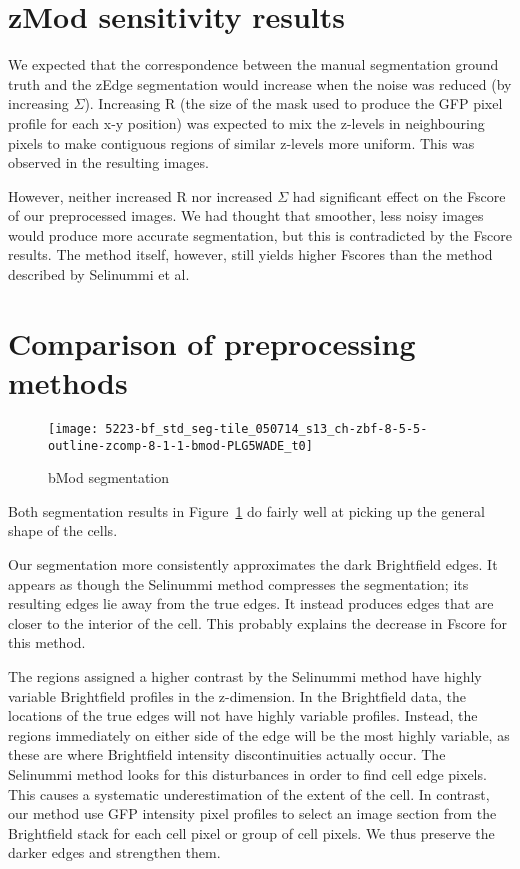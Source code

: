 \section{zMod sensitivity results}

We expected that the correspondence between the manual segmentation ground truth and the zEdge segmentation would increase when the noise was reduced (by increasing $\Sigma$). Increasing R (the size of the mask used to produce the GFP pixel profile for each x-y position) was expected to mix the z-levels in neighbouring pixels to make contiguous regions of similar z-levels more uniform. This was observed in the resulting images.

However, neither increased R nor increased $\Sigma$ had significant effect on the Fscore of our preprocessed images. We had thought that smoother, less noisy images would produce more accurate segmentation, but this is contradicted by the Fscore results. The method itself, however, still yields higher Fscores than the method described by Selinummi et al.

\section{Comparison of preprocessing methods}

\begin{figure}[htbp!]
\centering
\texttt{[image: 5223-bf\_std\_seg-tile\_050714\_s13\_ch-zbf-8-5-5-outline-zcomp-8-1-1-bmod-PLG5WADE\_t0]}
\caption{bMod segmentation}
\label{fig:bmod_segmentation}
\end{figure}

Both segmentation results in Figure~\ref{fig:bmod_segmentation} do fairly well at picking up the general shape of the cells.

Our segmentation more consistently approximates the dark Brightfield edges. It appears as though the Selinummi method compresses the segmentation; its resulting edges lie away from the true edges. It instead produces edges that are closer to the interior of the cell. This probably explains the decrease in Fscore for this method.

The regions assigned a higher contrast by the Selinummi method have highly variable Brightfield profiles in the z-dimension. In the Brightfield data, the locations of the true edges will not have highly variable profiles. Instead, the regions immediately on either side of the edge will be the most highly variable, as these are where Brightfield intensity discontinuities actually occur. The Selinummi method looks for this disturbances in order to find cell edge pixels. This causes a systematic underestimation of the extent of the cell. In contrast, our method use GFP intensity pixel profiles to select an image section from the Brightfield stack for each cell pixel or group of cell pixels. We thus preserve the darker edges and strengthen them.
